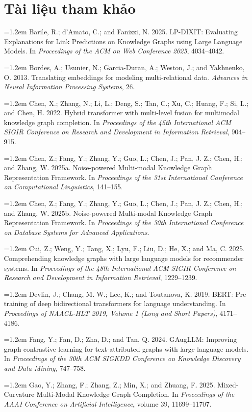 \documentclass[10pt,twocolumn,a4paper]{article}
\begin{document}
\section*{Tài liệu tham khảo}
\small
\newcommand{\refitem}[1]{\par\noindent\hangindent=1.2em #1\par\vspace{1.5pt}}
\refitem{Barile, R.; d'Amato, C.; and Fanizzi, N. 2025. LP-DIXIT: Evaluating Explanations for Link Predictions on Knowledge Graphs using Large Language Models. In \textit{Proceedings of the ACM on Web Conference 2025}, 4034--4042.}
\refitem{Bordes, A.; Usunier, N.; Garcia-Duran, A.; Weston, J.; and Yakhnenko, O. 2013. Translating embeddings for modeling multi-relational data. \textit{Advances in Neural Information Processing Systems}, 26.}
\refitem{Chen, X.; Zhang, N.; Li, L.; Deng, S.; Tan, C.; Xu, C.; Huang, F.; Si, L.; and Chen, H. 2022. Hybrid transformer with multi-level fusion for multimodal knowledge graph completion. In \textit{Proceedings of the 45th International ACM SIGIR Conference on Research and Development in Information Retrieval}, 904--915.}
\refitem{Chen, Z.; Fang, Y.; Zhang, Y.; Guo, L.; Chen, J.; Pan, J. Z.; Chen, H.; and Zhang, W. 2025a. Noise-powered Multi-modal Knowledge Graph Representation Framework. In \textit{Proceedings of the 31st International Conference on Computational Linguistics}, 141--155.}
\refitem{Chen, Z.; Fang, Y.; Zhang, Y.; Guo, L.; Chen, J.; Pan, J. Z.; Chen, H.; and Zhang, W. 2025b. Noise-powered Multi-modal Knowledge Graph Representation Framework. In \textit{Proceedings of the 30th International Conference on Database Systems for Advanced Applications}.}
\refitem{Cui, Z.; Weng, Y.; Tang, X.; Lyu, F.; Liu, D.; He, X.; and Ma, C. 2025. Comprehending knowledge graphs with large language models for recommender systems. In \textit{Proceedings of the 48th International ACM SIGIR Conference on Research and Development in Information Retrieval}, 1229--1239.}
\refitem{Devlin, J.; Chang, M.-W.; Lee, K.; and Toutanova, K. 2019. BERT: Pre-training of deep bidirectional transformers for language understanding. In \textit{Proceedings of NAACL-HLT 2019, Volume 1 (Long and Short Papers)}, 4171--4186.}
\refitem{Fang, Y.; Fan, D.; Zha, D.; and Tan, Q. 2024. GAugLLM: Improving graph contrastive learning for text-attributed graphs with large language models. In \textit{Proceedings of the 30th ACM SIGKDD Conference on Knowledge Discovery and Data Mining}, 747--758.}
\refitem{Gao, Y.; Zhang, F.; Zhang, Z.; Min, X.; and Zhuang, F. 2025. Mixed-Curvature Multi-Modal Knowledge Graph Completion. In \textit{Proceedings of the AAAI Conference on Artificial Intelligence}, volume 39, 11699--11707.}
\end{document}
